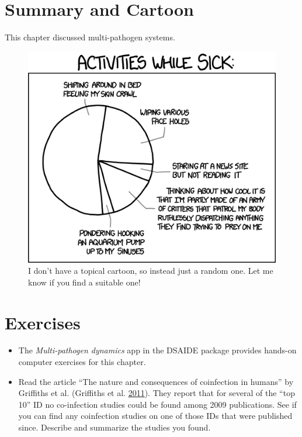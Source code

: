\documentclass[]{book}
\providecommand{\tightlist}{%
  \setlength{\itemsep}{0pt}\setlength{\parskip}{0pt}}
\theoremstyle{definition}
\theoremstyle{definition}
\theoremstyle{definition}
\theoremstyle{remark}
\begin{document}
\section{Summary and Cartoon}\label{summary-and-cartoon-11}

This chapter discussed multi-pathogen systems.

\begin{figure}
\centering
\includegraphics{./images/xkcd-sick_day.png}
\caption{I don't have a topical cartoon, so instead just a random one.
Let me know if you find a suitable one!}
\end{figure}

\section{Exercises}\label{exercises-11}

\begin{itemize}
\tightlist
\item
  The \emph{Multi-pathogen dynamics} app in the DSAIDE package provides
  hands-on computer exercises for this chapter.
\item
  Read the article ``The nature and consequences of coinfection in
  humans'' by Griffiths et al. (Griffiths et al.
  \protect\hyperlink{ref-griffiths11}{2011}). They report that for
  several of the ``top 10'' ID no co-infection studies could be found
  among 2009 publications. See if you can find any coinfection studies
  on one of those IDs that were published since. Describe and summarize
  the studies you found.
\end{itemize}
\end{document}
